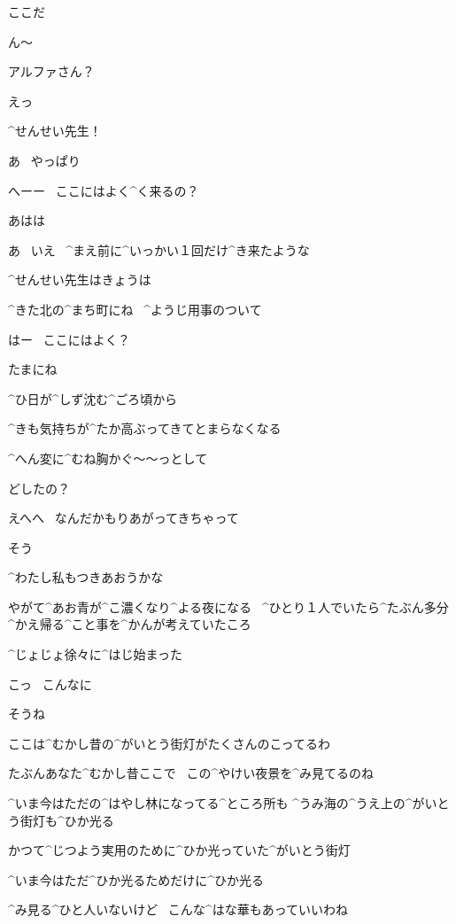 \Alpha ここだ

\Alpha ん〜

\Sensei アルファさん？

\Alpha えっ

\page
\Alpha ^{せんせい}{先生}！

\Sensei あ
\ やっぱり

\Sensei へーー
\ ここにはよく^{く}{来}るの？

\Alpha あはは

\Alpha あ
\ いえ
\ ^{まえ}{前}に^{いっかい}{１回}だけ^{き}{来}たような

\Alpha ^{せんせい}{先生}はきょうは

\Sensei ^{きた}{北}の^{まち}{町}にね
\ ^{ようじ}{用事}のついて

\Alpha はー
\ ここにはよく？

\Sensei たまにね

\page
\Alpha ^{ひ}{日}が^{しず}{沈}む^{ごろ}{頃}から

\Alpha ^{きも}{気持}ちが^{たか}{高}ぶってきてとまらなくなる

\Alpha ^{へん}{変}に^{むね}{胸}かぐ〜〜っとして

\Sensei どしたの？

\Alpha えへへ
\ なんだかもりあがってきちゃって

\Sensei そう

\Sensei ^{わたし}{私}もつきあおうかな

\Alpha やがて^{あお}{青}が^{こ}{濃}くなり^{よる}{夜}になる
\ ^{ひとり}{１人}でいたら^{たぶん}{多分}^{かえ}{帰}る^{こと}{事}を^{かんが}{考}えていたころ

\Alpha ^{じょじょ}{徐々}に^{はじ}{始}まった

\page[112]
\Alpha こっ
\ こんなに

\page
\Sensei そうね

\Sensei ここは^{むかし}{昔}の^{がいとう}{街灯}がたくさんのこってるわ

\Sensei たぶんあなた^{むかし}{昔}ここで
\ この^{やけい}{夜景}を^{み}{見}てるのね

\Sensei ^{いま}{今}はただの^{はやし}{林}になってる^{ところ}{所}も
^{うみ}{海}の^{うえ}{上}の^{がいとう}{街灯}も^{ひか}{光}る

\Sensei かつて^{じつよう}{実用}のために^{ひか}{光}っていた^{がいとう}{街灯}

\page
\Sensei ^{いま}{今}はただ^{ひか}{光}るためだけに^{ひか}{光}る

\Sensei ^{み}{見}る^{ひと}{人}いないけど
\ こんな^{はな}{華}もあっていいわね


